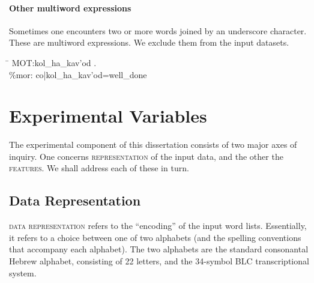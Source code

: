 \paragraph{Other multiword expressions} Sometimes one encounters two or more words joined 
by an underscore character. These are multiword expressions. We exclude them from
the input datasets. 
\begin{exe}
\ex \begin{tabbing}
\hspace{0.6in} \= \hspace{5.5in} \kill
\textsf{\*MOT:}\>\textsf{kol\_ha\_kav\a'{o}d .} \\
\textsf{\%mor:} \> \textsf{co|kol\_ha\_kav\a'{o}d=well\_done}
\end{tabbing}
\end{exe}


\section{Experimental Variables}\label{sec:expvars}
The experimental component of this dissertation consists of two major axes of inquiry. 
One concerns \textsc{representation} of the input data, and the other the \textsc{features}. 
We shall address each of these in turn. 


\subsection{Data Representation}\label{sev:expvars:datarep}

\textsc{data representation} refers to the ``encoding'' of the input
word lists. Essentially, it refers to a choice between one of two alphabets (and the spelling conventions that 
accompany each alphabet). The two alphabets are the standard consonantal Hebrew alphabet, consisting of 22 letters,
and the 34-symbol \ac{BLC} transcriptional system. 




